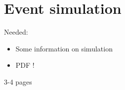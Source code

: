 \FloatBarrier
\chapter{Event simulation}

Needed:
\begin{itemize}
\item Some information on simulation
\item PDF !
\end{itemize}

3-4 pages
